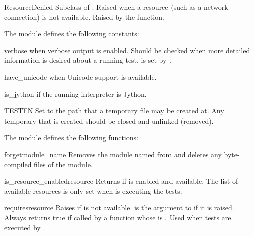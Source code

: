 \begin{excdesc}{ResourceDenied}
Subclass of .
Raised when a resource (such as a network connection) is not available.
Raised by the  function.
\end{excdesc}


The  module defines the following constants:

\begin{datadesc}{verbose}
 when verbose output is enabled.
Should be checked when more detailed information is desired about a running
test.
 is set by .
\end{datadesc}

\begin{datadesc}{have_unicode}
 when Unicode support is available.
\end{datadesc}

\begin{datadesc}{is_jython}
 if the running interpreter is Jython.
\end{datadesc}

\begin{datadesc}{TESTFN}
Set to the path that a temporary file may be created at.
Any temporary that is created should be closed and unlinked (removed).
\end{datadesc}


The  module defines the following functions:

\begin{funcdesc}{forget}{module_name}
Removes the module named  from  and deletes
any byte-compiled files of the module.
\end{funcdesc}

\begin{funcdesc}{is_resource_enabled}{resource}
Returns  if  is enabled and available.
The list of available resources is only set when  is
executing the tests.
\end{funcdesc}

\begin{funcdesc}{requires}{resource}
Raises  if  is not available.
 is the argument to  if it is raised.
Always returns true if called by a function whose  is
.
Used when tests are executed by .
\end{funcdesc}

